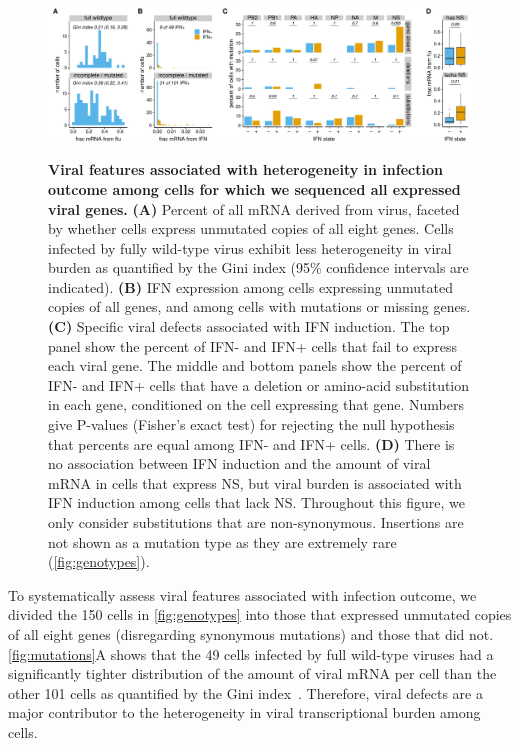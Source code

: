 \documentclass[10pt,letterpaper]{article}
\newenvironment{fullwidth}{%
  \begin{adjustwidth}{-2.3in}{}
}{\end{adjustwidth}}
\newcommand{\FIG}[1]{\autoref{fig:#1}}
\begin{document}
\begin{figure}
\begin{fullwidth}
{\centering
\includegraphics[width=\linewidth]{figures/single_cell_figures/p_mutations.pdf}
}
\caption{
{\bf Viral features associated with heterogeneity in infection outcome among cells for which we sequenced all expressed viral genes.}
{\bf (A)} 
Percent of all mRNA derived from virus, faceted by whether cells express unmutated copies of all eight genes.
Cells infected by fully wild-type virus exhibit less heterogeneity in viral burden as quantified by the Gini index (95\% confidence intervals are indicated).
{\bf (B)}
IFN expression among cells expressing unmutated copies of all genes, and among cells with mutations or missing genes.
{\bf (C)}
Specific viral defects associated with IFN induction.
The top panel show the percent of IFN- and IFN+ cells that fail to express each viral gene.
The middle and bottom panels show the percent of IFN- and IFN+ cells that have a deletion or amino-acid substitution in each gene, conditioned on the cell expressing that gene.
Numbers give P-values (Fisher's exact test) for rejecting the null hypothesis that percents are equal among IFN- and IFN+ cells. 
{\bf (D)}
There is no association between IFN induction and the amount of viral mRNA in cells that express NS, but viral burden is associated with IFN induction among cells that lack NS.
Throughout this figure, we only consider substitutions that are non-synonymous.
Insertions are not shown as a mutation type as they are extremely rare (\FIG{genotypes}).
}
\label{fig:mutations}

\end{fullwidth}
\end{figure}

To systematically assess viral features associated with infection outcome, we divided the 150 cells in \FIG{genotypes} into those that expressed unmutated copies of all eight genes (disregarding synonymous mutations) and those that did not.
\FIG{mutations}A shows that the 49 cells infected by full wild-type viruses had a significantly tighter distribution of the amount of viral mRNA per cell than the other 101 cells as quantified by the Gini index~\cite{gini1921measurement}.
Therefore, viral defects are a major contributor to the heterogeneity in viral transcriptional burden among cells.
\end{document}
